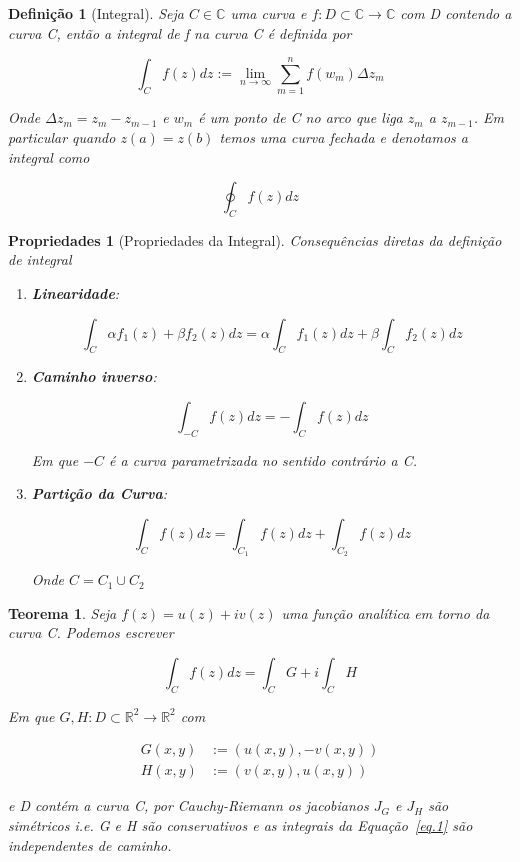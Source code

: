 \documentclass{article}
\newtheorem{prop}{Propriedades}
\newtheorem{theorem}{Teorema}
\newtheorem{definition}{Definição}
\begin{document}
\begin{definition}[Integral]
Seja $C \in \mathbb{C}$ uma curva e $f: D \subset \mathbb{C} \rightarrow \mathbb{C}$ com D contendo a curva C, então a integral de f na curva C é definida por

$$\int_C f(z) d z := \lim_{n \rightarrow \infty} \sum_{m=1}^n f(w_m) \Delta z_m$$

Onde $\Delta z_m = z_m - z_{m - 1}$ e $w_m$ é um ponto de C no arco que liga $z_m$ a $z_{m - 1}$. Em particular quando $z(a) = z(b)$ temos uma curva fechada e denotamos a integral como

$$\oint_C f(z) d z$$
\end{definition}

\begin{prop}[Propriedades da Integral] Consequências diretas da definição de integral

\begin{enumerate}
    \item \textbf{Linearidade}:
    
    $$\int_C \alpha  f_1(z) + \beta f_2(z) d z = \alpha \int_C f_1(z) d z + \beta \int_C f_2(z) d z$$
    
    \item \textbf{Caminho inverso}:
    
    $$\int_{-C} f(z) d z = - \int_{C} f(z) d z$$
    
    Em que $-C$ é a curva parametrizada no sentido contrário a C.
    
    \item \textbf{Partição da Curva}:
    
    $$\int_C f(z) d z = \int_{C_1} f(z) d z + \int_{C_2} f(z) d z$$
    
    Onde $C = C_1 \cup C_2$
\end{enumerate}
\end{prop}

\begin{theorem}
Seja $f(z) = u(z) + i v(z)$ uma função analítica em torno da curva C. Podemos escrever

\begin{equation}\label{eq.1}
    \int_C f(z) dz = \int_C G + i \int_C H
\end{equation}

Em que $G,H: D \subset \mathbb{R}^2 \rightarrow \mathbb{R}^2$ com

\begin{align*}
    G(x, y) &:= (u(x, y), - v(x, y)) \\
    H(x, y) &:= (v(x, y), u(x, y))
\end{align*}

e D contém a curva C, por Cauchy-Riemann os jacobianos $J_G$ e $J_H$ são simétricos i.e. G e H são conservativos e as integrais da Equação~\ref{eq.1} são independentes de caminho.
\end{theorem}
\end{document}
